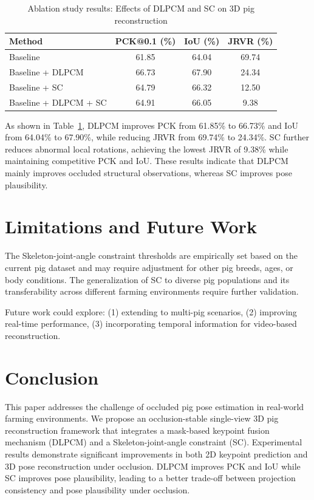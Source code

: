 \documentclass[runningheads]{llncs}
\begin{document}
\begin{table}
\caption{Ablation study results: Effects of DLPCM and SC on 3D pig reconstruction}
\label{tab:ablation}
\begin{tabular}{|l|c|c|c|}
\hline
Method & PCK@0.1 (\%) & IoU (\%) & JRVR (\%) \\
\hline
Baseline & 61.85 & 64.04 & 69.74 \\
Baseline + DLPCM & 66.73 & 67.90 & 24.34 \\
Baseline + SC & 64.79 & 66.32 & 12.50 \\
Baseline + DLPCM + SC & 64.91 & 66.05 & 9.38 \\
\hline
\end{tabular}
\end{table}

As shown in Table~\ref{tab:ablation}, DLPCM improves PCK from 61.85\% to 66.73\% and IoU from 64.04\% to 67.90\%, while reducing JRVR from 69.74\% to 24.34\%. SC further reduces abnormal local rotations, achieving the lowest JRVR of 9.38\% while maintaining competitive PCK and IoU. These results indicate that DLPCM mainly improves occluded structural observations, whereas SC improves pose plausibility.

\section{Limitations and Future Work}
\label{sec:limitations}

The Skeleton-joint-angle constraint thresholds are empirically set based on the current pig dataset and may require adjustment for other pig breeds, ages, or body conditions. The generalization of SC to diverse pig populations and its transferability across different farming environments require further validation.

Future work could explore: (1) extending to multi-pig scenarios, (2) improving real-time performance, (3) incorporating temporal information for video-based reconstruction.

\section{Conclusion}
\label{sec:conclusion}

This paper addresses the challenge of occluded pig pose estimation in real-world farming environments. We propose an occlusion-stable single-view 3D pig reconstruction framework that integrates a mask-based keypoint fusion mechanism (DLPCM) and a Skeleton-joint-angle constraint (SC). Experimental results demonstrate significant improvements in both 2D keypoint prediction and 3D pose reconstruction under occlusion. DLPCM improves PCK and IoU while SC improves pose plausibility, leading to a better trade-off between projection consistency and pose plausibility under occlusion.
\end{document}
